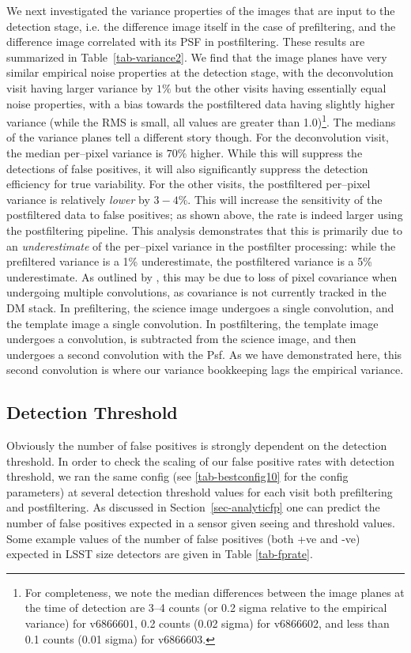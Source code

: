 \documentclass[prd, nofootinbib, floatfix, 11pt,tightenlines,times]{article}
\begin{document}
We next investigated the variance properties of the images that are
input to the detection stage, i.e. the difference image itself in the
case of prefiltering, and the difference image correlated with its PSF
in postfiltering.  These results are summarized in
Table~\ref{tab-variance2}.  We find that the image planes have very
similar empirical noise properties at the detection stage, with the
deconvolution visit having larger variance by $1\%$ but the other
visits having essentially equal noise properties, with a bias towards
the postfiltered data having slightly higher variance (while the RMS
is small, all values are greater than 1.0)\footnote{For completeness,
  we note the median differences between the image planes at the time
  of detection are 3--4 counts (or 0.2 sigma relative to the empirical
  variance) for v6866601, 0.2 counts (0.02 sigma) for v6866602, and
  less than 0.1 counts (0.01 sigma) for v6866603.}.  The medians of
the variance planes tell a different story though.  For the
deconvolution visit, the median per--pixel variance is $70\%$ higher.
While this will suppress the detections of false positives, it will
also significantly suppress the detection efficiency for true
variability.  For the other visits, the postfiltered per--pixel
variance is relatively {\it lower} by $3-4\%$.  This will increase
the sensitivity of the postfiltered data to false positives; as shown
above, the rate is indeed larger using the postfiltering pipeline.
This analysis demonstrates that this is primarily due to an {\it
  underestimate} of the per--pixel variance in the postfilter
processing: while the prefiltered variance is a 1\% underestimate, the
postfiltered variance is a 5\% underestimate.  As outlined by
\cite{Price-Stacking}, this may be due to loss of pixel covariance
when undergoing multiple convolutions, as covariance is not currently
tracked in the DM stack.  In prefiltering, the science image undergoes
a single convolution, and the template image a single convolution.  In
postfiltering, the template image undergoes a convolution, is
subtracted from the science image, and then undergoes a second
convolution with the Psf.  As we have demonstrated here, this second
convolution is where our variance bookkeeping lags the empirical
variance.

\subsection{Detection Threshold}
Obviously the number of false positives is strongly dependent on the detection threshold.  In order to
check the scaling of our false positive rates with detection threshold, we ran the same config (see \ref{tab-bestconfig10} 
for the config parameters)
at several detection threshold values for each visit both prefiltering and postfiltering.  As discussed in 
Section~\ref{sec-analyticfp} one can predict the number of false positives expected in a sensor given
seeing and threshold values.  Some example values of the number of false positives (both +ve and -ve)
expected in LSST size detectors are given in Table \ref{tab-fprate}.  
\end{document}
